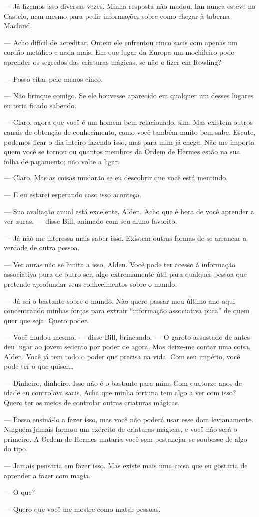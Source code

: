 --- Já fizemos isso diversas vezes. Minha resposta não mudou. Ian nunca esteve
no Castelo, nem mesmo para pedir informações sobre como chegar à taberna
Maclaud.

--- Acho difícil de acreditar. Ontem ele enfrentou cinco sacis com apenas um
cordão metálico e nada mais. Em que lugar da Europa um mochileiro pode aprender
os segredos das criaturas mágicas, se não o fizer em Rowling?

--- Posso citar pelo menos cinco.

--- Não brinque comigo. Se ele houvesse aparecido em qualquer um desses lugares
eu teria ficado sabendo.

--- Claro, agora que você é um homem bem relacionado, sim. Mas existem outros
canais de obtenção de conhecimento, como você também muito bem sabe. Escute,
podemos ficar o dia inteiro fazendo isso, mas para mim já chega. Não me importa
quem você se tornou ou quantos membros da Ordem de Hermes estão na sua folha de
pagamento; não volte a ligar.

--- Claro. Mas as coisas mudarão se eu descobrir que você está mentindo.

--- E eu estarei esperando caso isso aconteça.


--- Sua avaliação anual está excelente, Alden. Acho que é hora de você aprender
a ver auras. --- disse Bill, animado com seu aluno favorito.

--- Já não me interessa mais saber isso. Existem outras formas de se arrancar a
verdade de outra pessoa.

--- Ver auras não se limita a isso, Alden. Você pode ter acesso à informação
associativa pura de outro ser, algo extremamente útil para qualquer pessoa que
pretende aprofundar seus conhecimentos sobre o mundo.

--- Já sei o bastante sobre o mundo. Não quero passar meu último ano aqui
concentrando minhas forças para extrair “informação associativa pura” de quem
quer que seja. Quero poder.

--- Você mudou mesmo. --- disse Bill, brincando. --- O garoto assustado de
antes deu lugar ao jovem sedento por poder de agora. Mas deixe-me contar uma
coisa, Alden. Você já tem todo o poder que precisa na vida. Com seu império,
você pode ter o que quiser\ldots

--- Dinheiro, dinheiro. Isso não é o bastante para mim. Com quatorze anos de
idade eu controlava sacis. Acha que minha fortuna tem algo a ver com isso?
Quero ter os meios de controlar outras criaturas mágicas.

--- Posso ensiná-lo a fazer isso, mas você não poderá usar esse dom
levianamente. Ninguém jamais formou um exército de criaturas mágicas, e você
não será o primeiro. A Ordem de Hermes mataria você sem pestanejar se soubesse
de algo do tipo.

--- Jamais pensaria em fazer isso. Mas existe mais uma coisa que eu gostaria de
aprender a fazer com magia.

--- O que?

--- Quero que você me mostre como matar pessoas.
